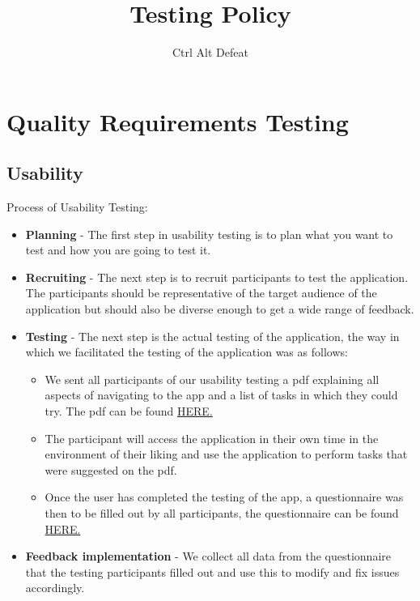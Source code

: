 \documentclass[12pt]{article}
\title{Testing Policy}
\author{Ctrl Alt Defeat}
\begin{document}

\tableofcontents
\newpage

\newpage
\section{Quality Requirements Testing}
\subsection{Usability}
Process of Usability Testing:
\begin{itemize}
    \item \textbf{Planning} - The first step in usability testing is to plan what you want to test and how you are going to test it.
    \item \textbf{Recruiting} - The next step is to recruit participants to test the application. The participants should be representative of the target audience of the application but should also be diverse enough to get a wide range of feedback.
    \item \textbf{Testing} - The next step is the actual testing of the application, the way in which we facilitated the testing of the application was as follows:
          \begin{itemize}
              \item We sent all participants of our usability testing a pdf explaining all aspects of navigating to the app and a list of tasks in which they could try. The pdf can be found \href{https://github.com/COS301-SE-2023/Domain-Pulse-A-Sentiment-Analysis-Platform/blob/docs/Demo4Documentation/documentation/Testing%20Policy/Testing_Assistance_Domain_Pulse.pdf}{HERE.}
              \item The participant will access the application in their own time in the environment of their liking and use the application to perform tasks that were suggested on the pdf.
              \item Once the user has completed the testing of the app, a questionnaire was then to be filled out by all participants, the questionnaire can be found \href{https://forms.gle/P6EC4iyg7ZD93LNfA}{HERE.}
          \end{itemize}
    \item \textbf{Feedback implementation} - We collect all data from the questionnaire that the testing participants filled out and use this to modify and fix issues accordingly.
\end{itemize}
\end{document}
